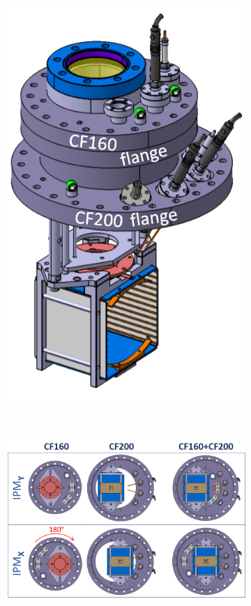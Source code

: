\begin{figure}[!ht]
	\begin{subfigure}[t]{0.25\textwidth}
		\includegraphics[width=\textwidth]{05_Conclusion/figures/fig000_bride_double_a}
		\caption{}
		\label{}
	\end{subfigure}
	~
	\begin{subfigure}[t]{0.75\textwidth}
		\includegraphics[width=\textwidth]{05_Conclusion/figures/fig000_bride_double_b}

\end{subfigure}
\end{figure}
